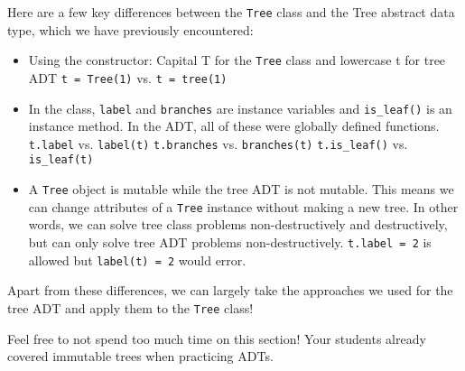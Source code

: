 \vspace{2mm}
Here are a few key differences between the \lstinline{Tree} class and the Tree abstract data type, which we have previously encountered: 
\begin{itemize}
\item Using the constructor: Capital T for the \lstinline{Tree} class and lowercase t for tree ADT
    \lstinline{t = Tree(1)} vs. \lstinline{t = tree(1)}
\item In the class, \lstinline{label} and \lstinline{branches} are instance variables and \lstinline{is_leaf()} is an instance method. In the ADT, all of these were globally defined functions.
    \subitem \lstinline{t.label} vs. \lstinline{label(t)}
    \subitem \lstinline{t.branches} vs. \lstinline{branches(t)}
    \subitem \lstinline{t.is_leaf()} vs. \lstinline{is_leaf(t)}
\item A \lstinline{Tree} object is mutable while the tree ADT is not mutable. This means we can change attributes of a \lstinline{Tree} instance without making a new tree. In other words, we can solve tree class problems non-destructively and destructively, but can only solve tree ADT problems non-destructively.
    \subitem \lstinline{t.label = 2} is allowed but \lstinline{label(t) = 2} would error.
\end{itemize}
Apart from these differences, we can largely take the approaches we used for the tree ADT and apply them to the \lstinline{Tree} class!

\begin{meta}
Feel free to not spend too much time on this section! Your students already covered immutable trees when practicing ADTs.  
\end{meta}